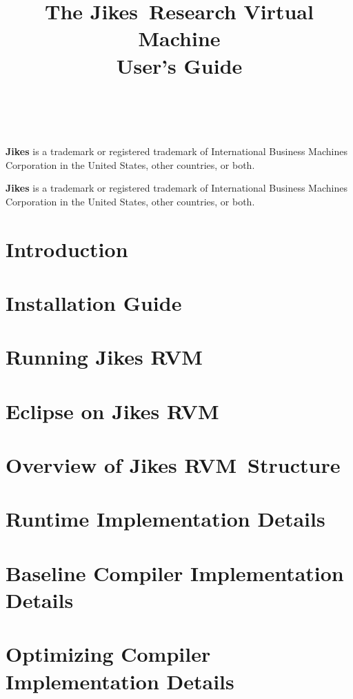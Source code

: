 \documentclass{article}
\title{\texonly{\vfill} {\huge The Jikes\JikesTMFootnote\ Research Virtual
Machine
\\
User's Guide} \\ {\huge \version} \\ { } \texonly{\vfill} }
\newcommand{\JikesTMFooter}{\W \hline \small {\bf Jikes} is a
trademark or registered trademark of International Business Machines
Corporation in the United States, other countries, or both.}
\newcommand{\jrvm}{Jikes RVM}
\begin{document}
\maketitle
\date{}

\T \JikesTMFooter

\T \newpage
\label{hlxtoc}
\T \tableofcontents
\T \listoffigures
\W {}

\W \JikesTMFooter

\T \newpage
\section{Introduction}


\T \newpage
\section{Installation Guide} \label{section:installation}


\T \newpage
\section{Running \jrvm} \label{section:running}


\T \newpage
\section{Eclipse on Jikes RVM} \label{section:eclipse}


\T \newpage
\section{Overview of \jrvm\ Structure}


\T \newpage
\section{Runtime Implementation Details}


\T \newpage
\section{Baseline Compiler Implementation Details}
\label{section:basedetails}


\T \newpage
\section{Optimizing Compiler Implementation Details}
\label{section:optdetails}

\end{document}
